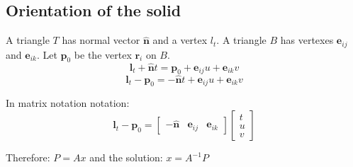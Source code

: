 



\subsection{Orientation of the solid}
A triangle $T$ has normal vector $\mathbf{\hat n}$ and a vertex $l_t$. A triangle $B$ has vertexes $\mathbf e_{ij}$ and $\mathbf e_{ik}$. Let $\mathbf p_0$ be the vertex $\mathbf r_i$ on $B$.
$$ \mathbf l_t + \mathbf{\hat n}t = \mathbf p_0 + \mathbf e_{ij}u + \mathbf e_{ik}v $$
$$ \mathbf l_t - \mathbf p_0 =  -\mathbf{\hat n}t + \mathbf e_{ij}u + \mathbf e_{ik}v $$

In matrix notation notation:
$$ \mathbf l_t - \mathbf p_0 = 
 \begin{bmatrix}
  -\mathbf{\hat n} & \mathbf e_{ij} & \mathbf e_{ik}
 \end{bmatrix}
 \begin{bmatrix}
  t \\
  u \\
  v
 \end{bmatrix}
$$

Therefore: $P = Ax$ and the solution: $x = A^{-1} P$

